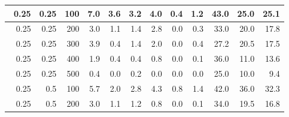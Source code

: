\begin{longtable}{|r|r|r|r|r|r|r|r|r|r|r|r|}
        \hline \
        0.25                           & 0.25                    & 100                       & 7.0                       & 3.6                       & 3.2                       & 4.0                       & 0.4                       & 1.2                       & 43.0                      & 25.0                      & 25.1                      \\
        \hline \
        0.25                           & 0.25                    & 200                       & 3.0                       & 1.1                       & 1.4                       & 2.8                       & 0.0                       & 0.3                       & 33.0                      & 20.0                      & 17.8                      \\
        \hline \
        0.25                           & 0.25                    & 300                       & 3.9                       & 0.4                       & 1.4                       & 2.0                       & 0.0                       & 0.4                       & 27.2                      & 20.5                      & 17.5                       \\
        \hline \
        0.25                           & 0.25                     & 400                       & 1.9                       & 0.4                       & 0.4                       & 0.8                       & 0.0                       & 0.1                       & 36.0                      & 11.0                      & 13.6                      \\
        \hline \
        0.25                           & 0.25                     & 500                       & 0.4                       & 0.0                       & 0.2                       & 0.0                       & 0.0                       & 0.0                       & 25.0                      & 10.0                      & 9.4                      \\
        \hline \
        0.25                           & 0.5                     & 100                       & 5.7                       & 2.0                       & 2.8                       & 4.3                       & 0.8                       & 1.4                       & 42.0                      & 36.0                      & 32.3                      \\
        \hline \
        0.25                           & 0.5                     & 200                       & 3.0                       & 1.1                       & 1.2                       & 0.8                       & 0.0                       & 0.1                       & 34.0                      & 19.5                      & 16.8                      \\

\end{longtable}
